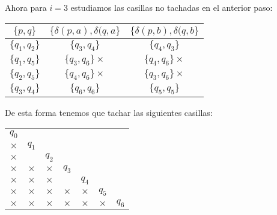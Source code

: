 \begin{itemize}
\begin{center}
        \end{center}
    Ahora para $i=3$ estudiamos las casillas no tachadas en el anterior paso:
    \begin{center}
            \begin{tabular}{c||c|c}
            $\{p,q\}$ & $\{\delta(p,a),\delta(q,a\}$ & $\{\delta(p,b),\delta(q,b\}$\\
            \hline
            $\{q_1,q_2\}$ & $\{q_3,q_4\}$ & $\{q_4,q_3\}$ \\
            \hline
            $\{q_1,q_5\}$ & $\{q_3,q_6\}\times$ & $\{q_4,q_6\}\times$ \\
            \hline
            $\{q_2,q_5\}$ & $\{q_4,q_6\}\times$ & $\{q_3,q_6\}\times$ \\
            \hline
            $\{q_3,q_4\}$ & $\{q_6,q_6\}$ & $\{q_5,q_5\}$\\
            \hline
            \end{tabular}
        \end{center}
    De esta forma tenemos que tachar las siguientes casillas:
    \begin{center}
            \begin{tabular}{ccccccc}
            $q_0$ \\ \cline{1-1}
            \multicolumn{1}{|c|}{$\times$} & $q_1$ \\
             \cline{1-2}
            \multicolumn{1}{|c|}{$\times$} & \multicolumn{1}{|c|}{} & $q_2$ \\ \cline{1-3}
            \multicolumn{1}{|c|}{$\times$} & \multicolumn{1}{|c|}{$\times$} & \multicolumn{1}{|c|}{$\times$} & $q_3$ \\
             \cline{1-4}
            \multicolumn{1}{|c|}{$\times$} & \multicolumn{1}{|c|}{$\times$} & \multicolumn{1}{|c|}{$\times$} & \multicolumn{1}{|c|}{} & $q_4$ \\ \cline{1-5}
            \multicolumn{1}{|c|}{$\times$} & \multicolumn{1}{|c|}{$\times$} & \multicolumn{1}{|c|}{$\times$} & \multicolumn{1}{|c|}{$\times$} & \multicolumn{1}{|c|}{$\times$} & $q_5$ \\
            \cline{1-6}
            \multicolumn{1}{|c|}{$\times$} & \multicolumn{1}{|c|}{$\times$} & \multicolumn{1}{|c|}{$\times$} & \multicolumn{1}{|c|}{$\times$} & \multicolumn{1}{|c|}{$\times$} & \multicolumn{1}{|c|}{$\times$} & $q_6$ \\
            \cline{1-6}   
            \end{tabular}
        \end{center}

\end{itemize}

